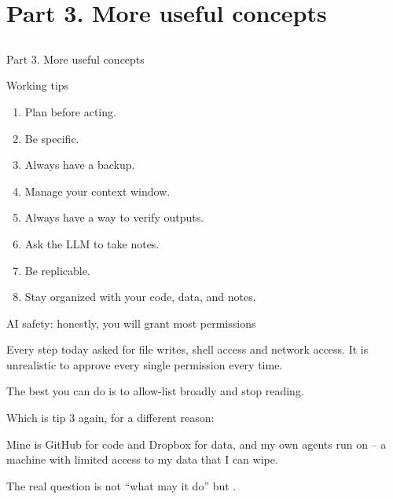 \section{Part 3. More useful concepts}\subsection{}

\begin{transitionframe}
Part 3. More useful concepts
\end{transitionframe}

\begin{frame}{Working tips}
\begin{enumerate}
    \item Plan before acting.
    \item Be specific.
    \item Always have a backup.
    \item Manage your context window.
    \item Always have a way to verify outputs.
    \item Ask the LLM to take notes.
    \item Be replicable.
    \item Stay organized with your code, data, and notes.
\end{enumerate}
\end{frame}

\begin{frame}{AI safety: honestly, you will grant most permissions}
\begin{wideitemize}
    \item Every step today asked for file writes, shell access and network access. It is unrealistic to approve every single permission every time.
    \item The best you can do is to allow-list broadly and stop reading.
    \item Which is tip 3 again, for a different reason: 
    \item Mine is GitHub for code and Dropbox for data, and my own agents run on  -- a machine with limited access to my data that I can wipe.
    \item The real question is not ``what may it do'' but .
\end{wideitemize}
\end{frame}

